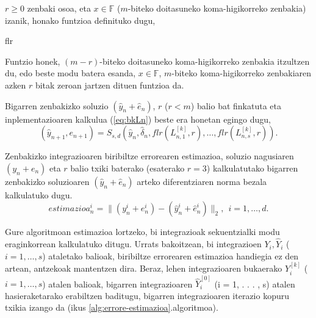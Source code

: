 $r\geqslant0$ zenbaki osoa, eta $x \in \mathbb{F}$ ($m$-biteko doitasuneko koma-higikorreko zenbakia) izanik, honako funtzioa definituko dugu,

\begin{algorithm}[H]
  \SetAlgoLined\DontPrintSemicolon
  \caption{flr}
\end{algorithm} 

Funtzio honek, $(m-r)$-biteko doitasuneko koma-higikorreko zenbakia itzultzen du, edo beste modu batera esanda, $x \in \mathbb{F}$, $m$-biteko koma-higikorreko zenbakiaren azken $r$ bitak zeroan jartzen dituen funtzioa da.

Bigarren zenbakizko soluzio $(\hat{y}_n+\hat{e}_{n})$, $r$ ($r<m$) balio bat finkatuta eta inplementazioaren kalkulua (\ref{eq:bkLn}) beste era honetan egingo dugu,
\begin{equation*}
\label{eq:bkLn2}
(\hat y_{n+1}, e_{n+1}) = S_{s,d}(\hat y_n, \hat{\delta}_n, flr(L_{n,1}^{[k]},r), \dots,flr(L_{n,s}^{[k]},r)).
\end{equation*}

Zenbakizko integrazioaren biribiltze errorearen estimazioa, soluzio nagusiaren $(y_n+e_{n})$ eta $r$  balio txiki baterako (esaterako $r=3$) kalkulatutako bigarren zenbakizko soluzioaren $(\hat{y}_n+\hat{e}_{n})$ arteko diferentziaren norma bezala kalkulatuko dugu. 
\begin{equation}
estimazioa_n^i=\|(y_n^i+e_n^i)-(\hat{y}_n^i+\hat{e}_{n}^i)\|_2, \ \ i=1,\dots,d.
\end{equation}

Gure algoritmoan estimazioa lortzeko, bi integrazioak sekuentzialki modu eraginkorrean kalkulatuko ditugu. Urrats bakoitzean, bi integrazioen $Y_i,\hat{Y}_i$ ($i=1,\dots,s$) ataletako balioak, biribiltze errorearen estimazioa handiegia ez den artean, antzekoak mantentzen dira. Beraz, lehen integrazioaren bukaerako $Y_i^{[k]}$ ($i=1,\dots,s$) atalen balioak, bigarren integrazioaren $\hat{Y}_i^{[0]}$ (i = 1, . . . , s) atalen hasieraketarako erabiltzen baditugu, bigarren integrazioaren iterazio kopuru txikia izango da (ikus \ref{alg:errore-estimazioa}.algoritmoa).  

